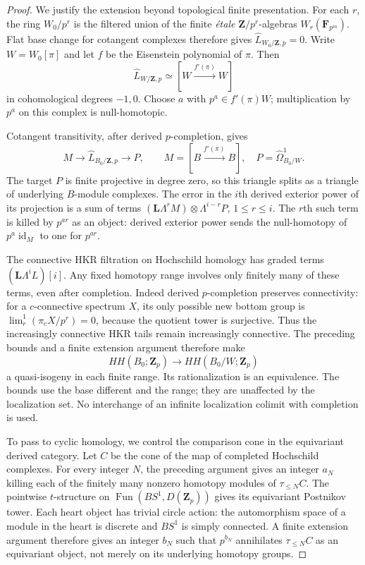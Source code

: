 \begin{proof}
We justify the extension beyond topological finite presentation.
For each $r$, the ring $W_0/p^r$ is the filtered union of the
finite \emph{\'{e}tale} $\mathbf Z/p^r$-algebras
$W_r(\mathbf F_{p^m})$. Flat base change for cotangent complexes
therefore gives $\widehat L_{W_0/\mathbf Z,p}=0$.
Write $W=W_0[\pi]$ and let $f$ be the Eisenstein polynomial of
$\pi$. Then
\[
 \widehat L_{W/\mathbf Z,p}
   \simeq[W\xrightarrow{f'(\pi)}W]
\]
in cohomological degrees $-1,0$. Choose $a$ with
$p^a\in f'(\pi)W$; multiplication by $p^a$ on this complex is
null-homotopic.

Cotangent transitivity, after derived $p$-completion, gives
\[
 M\longrightarrow\widehat L_{B_0/\mathbf Z,p}
       \longrightarrow P,
 \qquad M=[B\xrightarrow{f'(\pi)}B],\quad
 P=\widehat\Omega^1_{B_0/W}.
\]
The target $P$ is finite projective in degree zero, so this
triangle splits as a triangle of underlying $B$-module
complexes. The error in the $i$th derived exterior power of its
projection is a sum of terms
$(\mathbf L\Lambda^rM)\otimes\Lambda^{i-r}P$, $1\le r\le i$.
The $r$th such term is killed by $p^{ar}$ as an object: derived
exterior power sends the null-homotopy of $p^a\operatorname{id}_M$
to one for $p^{ar}$.

The connective HKR filtration on Hochschild homology has graded
terms $(\mathbf L\Lambda^iL)[i]$. Any fixed homotopy range
involves only finitely many of these terms, even after completion.
Indeed derived $p$-completion preserves connectivity: for a
$c$-connective spectrum $X$, its only possible new bottom group
is $\lim^1_r(\pi_cX/p^r)=0$, because the quotient tower is
surjective. Thus the increasingly connective HKR tails remain
increasingly connective. The preceding bounds
and a finite extension argument therefore make
\[
 HH(B_0;\mathbf Z_p)\longrightarrow HH(B_0/W;\mathbf Z_p)
\]
a quasi-isogeny in each finite range. Its rationalization is an
equivalence. The bounds use the base different and the range;
they are unaffected by the localization set. No interchange of
an infinite localization colimit with completion is used.

To pass to cyclic homology, we control the comparison cone in the
equivariant derived category. Let $C$ be the cone of the map of completed Hochschild
complexes. For every integer $N$, the preceding argument gives an
integer $a_N$ killing each of the finitely many nonzero homotopy
modules of $\tau_{\leq N}C$. The pointwise $t$-structure on
$\operatorname{Fun}(BS^1,D(\mathbf Z_p))$ gives its equivariant
Postnikov tower. Each heart object has trivial circle action:
the automorphism space of a module in the heart is discrete and
$BS^1$ is simply connected. A finite extension argument therefore
gives an integer $b_N$ such that $p^{b_N}$ annihilates
$\tau_{\leq N}C$ as an equivariant object, not merely on its
underlying homotopy groups.


\end{proof}
